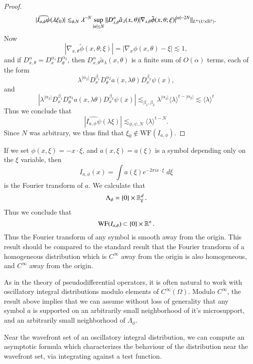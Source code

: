\begin{proof}
    \[ |\widehat{I_{a,\phi} \psi}(\lambda \xi_0)| \lesssim_{\phi,N} \lambda^{-N} \sup_{|\alpha| \leq N} \| D^\alpha_{x,\theta} \tilde{a}_\lambda(x,\theta) |\nabla_{x,\theta} \tilde{\phi}(x,\theta;\xi)|^{|\alpha| - 2N} \|_{L^\infty(U \times \operatorname{\mathbb{R}}^p)}. \]
    Now
    \[ |\nabla_{x,\theta} \tilde{\phi}(x,\theta;\xi)| = |\nabla_x \phi(x,\theta) - \xi| \lesssim 1, \]
    and if $D^\alpha_{x,\theta} = D^{\alpha_1}_x D^{\alpha_2}_\theta$, then $D^\alpha_{x,\theta} \tilde{a}_\lambda(x,\theta)$ is a finite sum of $O(\alpha)$ terms, each of the form
    \[ \lambda^{|\alpha_2|} D^{\beta_1}_x D^{\alpha_2}_\theta a(x,\lambda \theta) D^{\beta_2}_x \psi(x), \]
    and
    \[ |\lambda^{|\alpha_2|} D^{\beta_1}_x D^{\alpha_2}_\theta a(x,\lambda \theta) D^{\beta_2}_x \psi(x)| \lesssim_{\beta_1,\beta_2} \lambda^{|\alpha_2|} \langle \lambda \rangle^{t - |\alpha_2|} \lesssim \langle \lambda \rangle^t \]
    Thus we conclude that
    \[ |\widehat{I_{a,\phi} \psi}(\lambda \xi)| \lesssim_{\phi,\psi,N} \langle \lambda \rangle^{t - N}. \]
    Since $N$ was arbitrary, we thus find that $\xi_0 \not \in \text{WF}(I_{a,\phi})$.
\end{proof}

\begin{example}
    If we set $\phi(x,\xi) = - x \cdot \xi$, and $a(x,\xi) = a(\xi)$ is a symbol depending only on the $\xi$ variable, then
    \[ I_{a,\phi}(x) = \int a(\xi) e^{- 2 \pi i x \cdot \xi}\; d\xi \]
    is the Fourier transform of $a$. We calculate that
    \[ \Lambda_\phi = \{ 0 \} \times \operatorname{\mathbb{R}}^d_\xi. \]
    Thus we conclude that
    \[ \text{WF}(I_{a,\phi}) \subset \{ 0 \} \times \operatorname{\mathbb{R}}^n. \]
    Thus the Fourier transform of any symbol is smooth away from the origin. This result should be compared to the standard result that the Fourier transform of a homogeneous distribution which is $C^\infty$ away from the origin is also homogeneous, and $C^\infty$ away from the origin.
\end{example}

As in the theory of pseudodifferential operators, it is often natural to work with oscillatory integral distributions modulo elements of $C^\infty(\Omega)$. Modulo $C^\infty$, the result above implies that we can assume without loss of generality that any symbol $a$ is supported on an arbitrarily small neighborhood of it's microsupport, and an arbitrarily small neighborhood of $\Lambda_\phi$.

Near the wavefront set of an oscillatory integral distribution, we can compute an asymptotic formula which characterizes the behaviour of the distribution near the wavefront set, via integrating against a test function.

